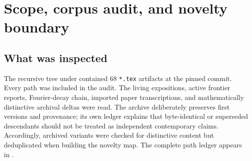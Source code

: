 \documentclass[11pt,oneside]{article}
\theoremstyle{definition}
\theoremstyle{remark}
\newcommand{\Up}{\operatorname{up}}
\newcommand{\sinc}{\operatorname{sinc}}
\newcommand{\dd}{\,\mathrm d}
\begin{document}
\begin{abstract}
Parseval turns the same norm law into a second, frequency-side geometry.  The pushforward of
$|\Phi(\xi)|^2\dd\xi/\norm{\Up}_2^2$ by $z=(2\pi\xi)^2$ has moments
\[
 m_n=2^{n(n+1)}=q^{-n(n+1)/2},\qquad q=\frac14.
\]
It is therefore an explicit nonclassical representing measure for a shifted
Stieltjes--Wigert moment problem.  A lognormal measure has the same moments but a different
density, proving indeterminacy directly.  We calculate the Hankel determinants, monic
orthogonal polynomials, recurrence coefficients, and Gaussian-$q$-binomial formulae, and
derive the spectral $q$-Pearson law
\[
 w_{\rm sp}(4z)=\frac12\sinc^2(\sqrt z)\,w_{\rm sp}(z).
\]
The report closes with numerical checks, explicit conjectures, a phase-locked confluent
$q$-Richardson program, and a Lean formalization roadmap.  Claims labelled ``new'' are new
relative to the pinned repository corpus after a formula- and terminology-level collision
audit; no universal publication-priority claim is made.
\end{abstract}


\newpage

\section{Scope, corpus audit, and novelty boundary}
\label{p4:sec:scope}

\subsection{What was inspected}

The recursive tree under \RepoRoot{} contained $68$ \texttt{*.tex} artifacts at the pinned
commit.  Every path was included in the audit.  The living expositions, active frontier
reports, Fourier-decay chain, imported paper transcriptions, and mathematically distinctive
archival deltas were read.  The archive deliberately preserves first versions and provenance;
its own ledger explains that byte-identical or superseded descendants should not be treated as
independent contemporary claims.  Accordingly, archived variants were checked for distinctive
content but deduplicated when building the novelty map.  The complete path ledger appears in
.
\end{document}
